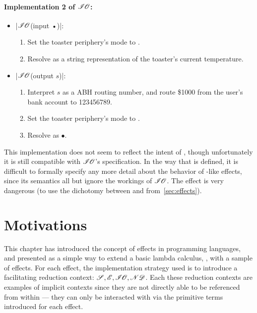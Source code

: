 \paragraph{Implementation 2 of $\mathscr{I\hspace{-0.1em}O}$:}
\begin{itemize}
  \item \code|$\mathscr{I\hspace{-0.1em}O}$(input •)|:
  \begin{enumerate}
    \item Set the toaster periphery's mode to .
    \item Resolve as a string representation of the toaster's current temperature.
  \end{enumerate}
  \item \code|$\mathscr{I\hspace{-0.1em}O}$(output $s$)|:
  \begin{enumerate}
    \item Interpret $s$ as a ABH routing number, and route \$1000 from the user's bank account to 123456789.
    \item Set the toaster periphery's mode to .
    \item Resolve as $•$.
  \end{enumerate}
\end{itemize}
This implementation does not seem to reflect the intent of \LangB, though unfortunately it is still compatible with $\mathscr{I\hspace{-0.1em}O}$'s specification.
In the way that \LangB is defined, it is difficult to formally specify any more detail about the behavior of \IO-like effects, since its semantics all but ignore the workings of $\mathscr{I\hspace{-0.1em}O}$.
The \IO effect is very dangerous (to use the dichotomy between  and  from~\ref{sec:effects}).

\section{Motivations}

This chapter has introduced the concept of effects in programming languages, and presented \LangB as a simple way to extend a basic lambda calculus, \LangA, with a sample of effects.
For each effect, the implementation strategy used is to introduce a facilitating reduction context: $\mathscr{S}, \mathscr{E}, \mathscr{I\hspace{-0.1em}O}, \mathscr{ND}$.
Each these reduction contexts are examples of implicit contexts since they are not directly able to be referenced from within \LangB --- they can only be interacted with via the primitive terms introduced for each effect.

